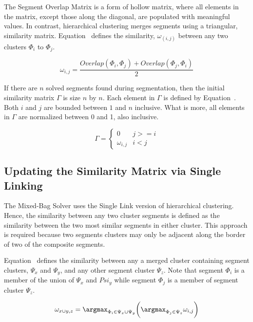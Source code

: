 The Segment Overlap Matrix is a form of hollow matrix, where all elements in the matrix, except those along the diagonal, are populated with meaningful values.  In contrast, hierarchical clustering merges segments using a triangular, similarity matrix.  Equation~ defines the similarity, $\omega_(i,j)$ between any two clusters $\Phi_i$ to $\Phi_j$.

\begin{equation} \label{eq:segmentSimilarity}
\omega_{i,j} = \frac{Overlap(\Phi_i, \Phi_j) + Overlap(\Phi_j, \Phi_i)}{2} 
\end{equation}

If there are $n$ solved segments found during segmentation, then the initial similarity matrix $\Gamma$ is size $n$ by $n$.  Each element in $\Gamma$ is defined by Equation~.  Both $i$ and $j$ are bounded between $1$ and $n$ inclusive.  What is more, all elements in $\Gamma$ are normalized between 0 and 1, also inclusive.

\begin{equation} \label{eq:similarityMatrix}
\Gamma = \begin{cases} 
	0 & j >= i
\\
	\omega_{i,j} & i < j
\end{cases} 
\end{equation}

\subsection{Updating the Similarity Matrix via Single Linking}

The Mixed-Bag Solver uses the Single Link version of hierarchical clustering.  Hence, the similarity between any two cluster segments is defined as the similarity between the two most similar segments in either cluster.  This approach is required because two segments clusters may only be adjacent along the border of two of the composite segments.  

Equation~ defines the similarity between any a merged cluster containing segment clusters, $\Psi_x$ and $\Psi_y$, and any other segment cluster $\Psi_z$.  Note that segment $\Phi_i$ is a member of the union of $\Psi_x$ and $Psi_y$ while segment $\Phi_j$ is a member of segment cluster $\Psi_z$.

\begin{equation} \label{eq:segmentClusterMerge}
	\omega_{x \cup y,z} = \argmax_{\Phi_i \in \Psi_x \cup \Psi_y} \bigg( \argmax_{\Phi_j \in \Psi_z} \omega_{i,j} \bigg) 
\end{equation}

